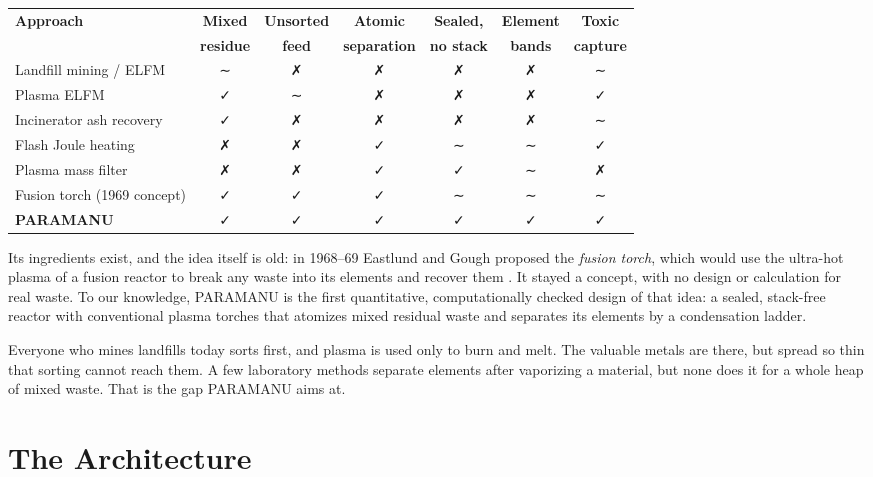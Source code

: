 \documentclass[11pt,a4paper]{article}
\begin{document}
\begin{center}
\small
\begin{tabular}{@{}lcccccc@{}}
\toprule
\textbf{Approach} & \textbf{Mixed} & \textbf{Unsorted} & \textbf{Atomic} & \textbf{Sealed,} & \textbf{Element} & \textbf{Toxic} \\
 & \textbf{residue} & \textbf{feed} & \textbf{separation} & \textbf{no stack} & \textbf{bands} & \textbf{capture} \\
\midrule
Landfill mining / ELFM & ∼ & ✗ & ✗ & ✗ & ✗ & ∼ \\
Plasma ELFM & ✓ & ∼ & ✗ & ✗ & ✗ & ✓ \\
Incinerator ash recovery & ✓ & ✗ & ✗ & ✗ & ✗ & ∼ \\
Flash Joule heating & ✗ & ✗ & ✓ & ∼ & ∼ & ✓ \\
Plasma mass filter & ✗ & ✗ & ✓ & ✓ & ∼ & ✗ \\
Fusion torch (1969 concept) & ✓ & ✓ & ✓ & ∼ & ∼ & ∼ \\
\midrule
\textbf{PARAMANU} & ✓ & ✓ & ✓ & ✓ & ✓ & ✓ \\
\bottomrule
\end{tabular}
\end{center}
\noindent Its ingredients exist, and the idea itself is old: in 1968--69 Eastlund and Gough proposed the \emph{fusion torch}, which would use the ultra-hot plasma of a fusion reactor to break any waste into its elements and recover them \citep{eastlund1969}. It stayed a concept, with no design or calculation for real waste. To our knowledge, PARAMANU is the first quantitative, computationally checked design of that idea: a sealed, stack-free reactor with conventional plasma torches that atomizes mixed residual waste and separates its elements by a condensation ladder.

\begin{plain}
Everyone who mines landfills today sorts first, and plasma is used only to burn and melt. The valuable metals are there, but spread so thin that sorting cannot reach them. A few laboratory methods separate elements after vaporizing a material, but none does it for a whole heap of mixed waste. That is the gap PARAMANU aims at.
\end{plain}

\section{The Architecture}\label{ch:arch}
\end{document}
